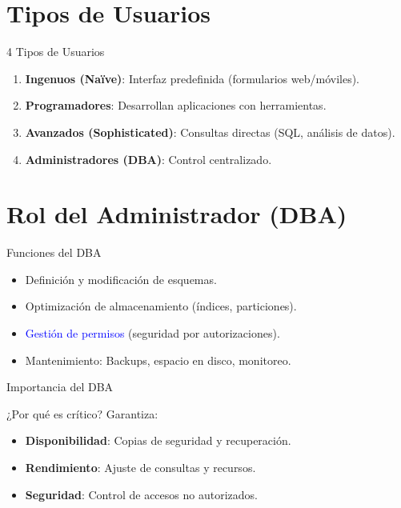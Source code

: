 \documentclass{beamer}
\begin{document}
\section{Tipos de Usuarios}
\begin{frame}{4 Tipos de Usuarios}
  \begin{enumerate}
    \item \textbf{Ingenuos (Naïve)}: Interfaz predefinida (formularios web/móviles).
    \item \textbf{Programadores}: Desarrollan aplicaciones con herramientas.
    \item \textbf{Avanzados (Sophisticated)}: Consultas directas (SQL, análisis de datos).
    \item \textbf{Administradores (DBA)}: Control centralizado.
  \end{enumerate}
\end{frame}

\section{Rol del Administrador (DBA)}
\begin{frame}{Funciones del DBA}
  \begin{itemize}
    \item Definición y modificación de esquemas.
    \item Optimización de almacenamiento (índices, particiones).
    \item \textcolor{blue}{Gestión de permisos} (seguridad por autorizaciones).
    \item Mantenimiento: Backups, espacio en disco, monitoreo.
  \end{itemize}
\end{frame}

\begin{frame}{Importancia del DBA}
  \begin{alertblock}{¿Por qué es crítico?}
    Garantiza:
    \begin{itemize}
      \item \textbf{Disponibilidad}: Copias de seguridad y recuperación.
      \item \textbf{Rendimiento}: Ajuste de consultas y recursos.
      \item \textbf{Seguridad}: Control de accesos no autorizados.
    \end{itemize}
  \end{alertblock}
\end{frame}
\end{document}
